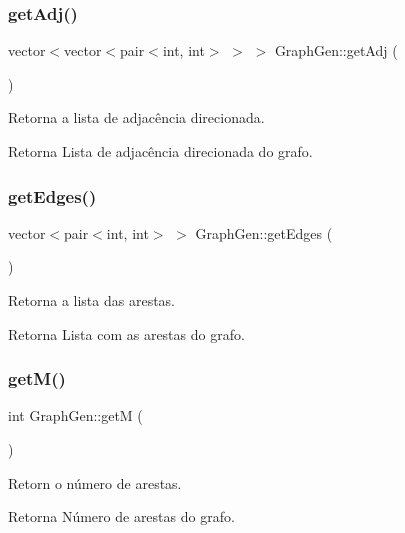 \subsubsection{\texorpdfstring{getAdj()}{getAdj()}}
{\footnotesize\ttfamily vector$<$vector$<$pair$<$int, int$>$ $>$ $>$ Graph\+Gen\+::get\+Adj (\begin{DoxyParamCaption}{ }\end{DoxyParamCaption})}

Retorna a lista de adjacência direcionada. \begin{DoxyReturn}{Retorna}
Lista de adjacência direcionada do grafo. 
\end{DoxyReturn}
\mbox{\label{classGraphGen_af140b74e5bbb7171a0b76f73d10c14ae}} 
\subsubsection{\texorpdfstring{getEdges()}{getEdges()}}
{\footnotesize\ttfamily vector$<$pair$<$int, int$>$ $>$ Graph\+Gen\+::get\+Edges (\begin{DoxyParamCaption}{ }\end{DoxyParamCaption})}

Retorna a lista das arestas. \begin{DoxyReturn}{Retorna}
Lista com as arestas do grafo. 
\end{DoxyReturn}
\mbox{\label{classGraphGen_aad12bcf774a0fa97150b01126d3a3e90}} 
\subsubsection{\texorpdfstring{getM()}{getM()}}
{\footnotesize\ttfamily int Graph\+Gen\+::getM (\begin{DoxyParamCaption}{ }\end{DoxyParamCaption})}

Retorn o número de arestas. \begin{DoxyReturn}{Retorna}
Número de arestas do grafo. 
\end{DoxyReturn}
\mbox{\label{classGraphGen_a32029b7e5e2c379bdc5412f0e954e121}} 
